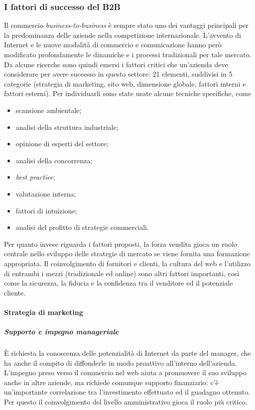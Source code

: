 \subsubsection{I fattori di successo del B2B}
Il commercio \textit{business-to-business} è sempre stato uno dei vantaggi principali per la predominanza delle aziende nella competizione internazionale. L'avvento di Internet e le nuove modalità di commercio e comunicazione hanno però modificato profondamente le dinamiche e i processi tradizionali per tale mercato. Da alcune ricerche sono quindi emersi i fattori critici che un'azienda deve considerare per avere successo in questo settore: 21 elementi, suddivisi in 5 categorie (strategia di marketing, sito web, dimensione globale, fattori interni e fattori esterni). Per individuarli sono state usate alcune tecniche specifiche, come
\begin{itemize}
	\item scansione ambientale;
	\item analisi della struttura industriale;
	\item opinione di esperti del settore;
	\item analisi della concorrenza;
	\item \textit{best practice};
	\item valutazione interna;
	\item fattori di intuizione;
	\item analisi del profitto di strategie commerciali.
\end{itemize}
Per quanto invece riguarda i fattori proposti, la forza vendita gioca un ruolo centrale nello sviluppo delle strategie di mercato se viene fornita una formazione appropriata. Il coinvolgimento di fornitori e clienti, la cultura del web e l'utilizzo di entrambi i mezzi (tradizionale ed online) sono altri fattori importanti, così come la sicurezza, la fiducia e la confidenza tra il venditore ed il potenziale cliente.

\paragraph{Strategia di marketing}
\subparagraph{Supporto e impegno manageriale}
È richiesta la conoscenza delle potenzialità di Internet da parte del manager, che ha anche il compito di diffonderle in modo proattivo all'interno dell'azienda. L'impegno preso verso il commercio nel web aiuta a promuovere il suo sviluppo anche in altre aziende, ma richiede comunque supporto finanziario: c'è un'importante correlazione tra l'investimento effettuato ed il guadagno ottenuto. Per questo il coinvolgimento del livello amministrativo gioca il ruolo più critico.

